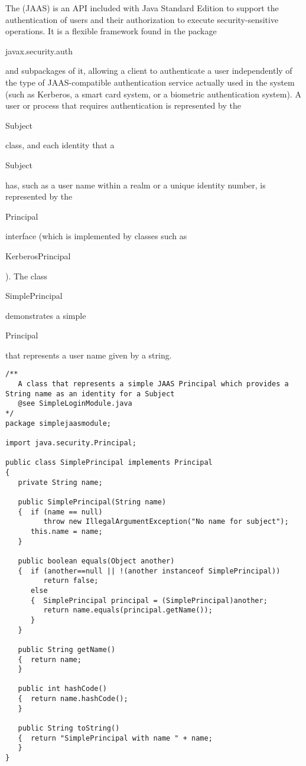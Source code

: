 The  (JAAS) is an API
included with Java Standard Edition to support the authentication of users and their
authorization to execute security-sensitive operations.
It is a flexible framework found in the package \begin{code}javax.security.auth\end{code}
and subpackages of it, allowing a client to authenticate a user independently of
the type of JAAS-compatible authentication service actually used in the system
(such as Kerberos, a smart card system, or a biometric authentication system).
A user or process that requires authentication is represented by the
\begin{code}Subject\end{code} class, and each identity that a
\begin{code}Subject\end{code} has,
such as a user name within a realm or a unique identity number,
is represented by the \begin{code}Principal\end{code} interface
(which is implemented by classes such as \begin{code}KerberosPrincipal\end{code}).
The class \begin{code}SimplePrincipal\end{code} demonstrates a simple
\begin{code}Principal\end{code} that represents a user name given by a string.
\begin{lstlisting}[caption=Java Authentication and Authorization Service]
/**
   A class that represents a simple JAAS Principal which provides a String name as an identity for a Subject
   @see SimpleLoginModule.java
*/
package simplejaasmodule;

import java.security.Principal;

public class SimplePrincipal implements Principal
{
   private String name;

   public SimplePrincipal(String name)
   {  if (name == null)
         throw new IllegalArgumentException("No name for subject");
      this.name = name;
   }

   public boolean equals(Object another)
   {  if (another==null || !(another instanceof SimplePrincipal))
         return false;
      else
      {  SimplePrincipal principal = (SimplePrincipal)another;
         return name.equals(principal.getName());
      }
   }

   public String getName()
   {  return name;
   }

   public int hashCode()
   {  return name.hashCode();
   }

   public String toString()
   {  return "SimplePrincipal with name " + name;
   }
}
\end{lstlisting}

